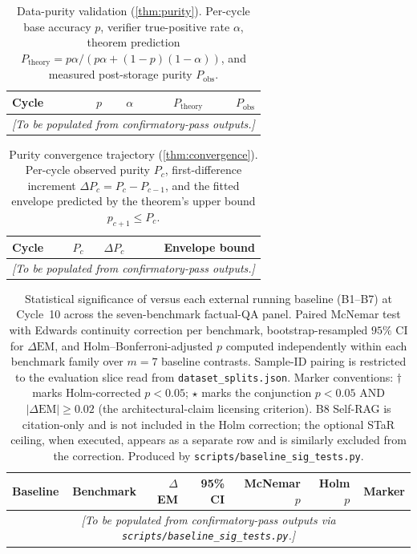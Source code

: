 \begin{table}[t]
\centering
\caption{Data-purity validation (\cref{thm:purity}). Per-cycle
base accuracy $p$, verifier true-positive rate $\alpha$, theorem
prediction $P_{\text{theory}} = p\alpha / (p\alpha + (1-p)(1-\alpha))$,
and measured post-storage purity $P_{\text{obs}}$.}
\label{tab:purity}
\begin{tabular}{lrrrr}
\toprule
Cycle & $p$ & $\alpha$ & $P_{\text{theory}}$ & $P_{\text{obs}}$ \\
\midrule
\multicolumn{5}{c}{\emph{[To be populated from confirmatory-pass outputs.]}}\\
\bottomrule
\end{tabular}
\end{table}

\begin{table}[t]
\centering
\caption{Purity convergence trajectory (\cref{thm:convergence}).
Per-cycle observed purity $P_c$, first-difference increment
$\Delta P_c = P_c - P_{c-1}$, and the fitted envelope predicted by
the theorem's upper bound $p_{c+1} \le P_c$.}
\label{tab:purity-convergence}
\begin{tabular}{lrrr}
\toprule
Cycle & $P_c$ & $\Delta P_c$ & Envelope bound \\
\midrule
\multicolumn{4}{c}{\emph{[To be populated from confirmatory-pass outputs.]}}\\
\bottomrule
\end{tabular}
\end{table}

\begin{table}[t]
\centering
\caption{Statistical significance of \caem{} versus each external running baseline (B1--B7) at Cycle~10 across the seven-benchmark factual-QA panel. Paired McNemar test with Edwards continuity correction per benchmark, bootstrap-resampled $95\%$ CI for $\Delta\mathrm{EM}$, and Holm--Bonferroni-adjusted $p$ computed independently within each benchmark family over $m = 7$ baseline contrasts. Sample-ID pairing is restricted to the evaluation slice read from \texttt{dataset\_splits.json}. Marker conventions: $\dagger$ marks Holm-corrected $p < 0.05$; $\star$ marks the conjunction $p < 0.05$ AND $|\Delta\mathrm{EM}| \geq 0.02$ (the architectural-claim licensing criterion). B8 Self-RAG is citation-only and is not included in the Holm correction; the optional STaR ceiling, when executed, appears as a separate row and is similarly excluded from the correction. Produced by \texttt{scripts/baseline\_sig\_tests.py}.}
\label{tab:sig-test}
\small
\begin{tabular}{llrrrrr}
\toprule
Baseline & Benchmark & $\Delta$EM & 95\% CI & McNemar $p$ & Holm $p$ & Marker \\
\midrule
\multicolumn{7}{c}{\emph{[To be populated from confirmatory-pass outputs via \texttt{scripts/baseline\_sig\_tests.py}.]}}\\
\bottomrule
\end{tabular}
\end{table}

